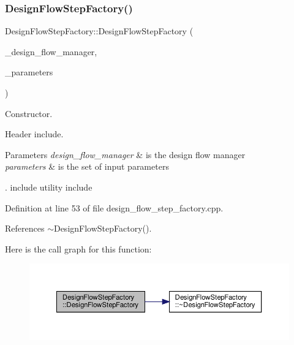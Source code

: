 \subsubsection{\texorpdfstring{Design\+Flow\+Step\+Factory()}{DesignFlowStepFactory()}}
{\footnotesize\ttfamily Design\+Flow\+Step\+Factory\+::\+Design\+Flow\+Step\+Factory (\begin{DoxyParamCaption}\item[{const Design\+Flow\+Manager\+Const\+Ref \&}]{\+\_\+design\+\_\+flow\+\_\+manager,  }\item[{const \hyperlink{Parameter_8hpp_a37841774a6fcb479b597fdf8955eb4ea}{Parameter\+Const\+Ref} \&}]{\+\_\+parameters }\end{DoxyParamCaption})}



Constructor. 

Header include.


\begin{DoxyParams}{Parameters}
{\em design\+\_\+flow\+\_\+manager} & is the design flow manager \\
\hline
{\em parameters} & is the set of input parameters\\
\hline
\end{DoxyParams}
. include utility include 

Definition at line 53 of file design\+\_\+flow\+\_\+step\+\_\+factory.\+cpp.



References $\sim$\+Design\+Flow\+Step\+Factory().

Here is the call graph for this function\+:
\nopagebreak
\begin{figure}[H]
\begin{center}
\leavevmode
\includegraphics[width=350pt]{d4/d6f/classDesignFlowStepFactory_aeedfbeb38320101d970256e261e98c6f_cgraph}
\end{center}
\end{figure}
\mbox{\label{classDesignFlowStepFactory_ad010d39c0b8c26a9889984526c8f4b17}} 

